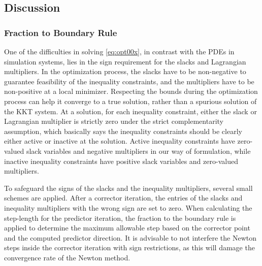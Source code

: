 \documentclass{article}
\theoremstyle{definition}
\begin{document}
\subsection{Discussion}

\subsubsection{Fraction to Boundary Rule}
One of the difficulties in solving \eqref{eq:opt00x}, in contrast with the PDEs in simulation systems, lies in the sign requirement for the slacks and Lagrangian multipliers. In the optimization process, the slacks have to be non-negative to guarantee feasibility of the inequality constraints, and the multipliers have to be non-positive at a local minimizer. Respecting the bounds during the optimization process can help it converge to a true solution, rather than a spurious solution of the KKT system. At a solution, for each inequality constraint, either the slack or Lagrangian multiplier is strictly zero under the strict complementarity assumption, which basically says the inequality constraints should be clearly either active or inactive at the solution. Active inequality constraints have zero-valued slack variables and negative multipliers in our way of formulation, while inactive inequality constraints have positive slack variables and zero-valued multipliers.

To safeguard the signs of the slacks and the inequality multipliers, several small schemes are applied. After a corrector iteration, the entries of the slacks and inequality multipliers with the wrong sign are set to zero. When calculating the step-length for the predictor iteration, the fraction to the boundary rule is applied to determine the maximum allowable step based on the corrector point and the computed predictor direction. It is advisable to not interfere the Newton steps inside the corrector iteration with sign restrictions, as this will damage the convergence rate of the Newton method.  
\end{document}
